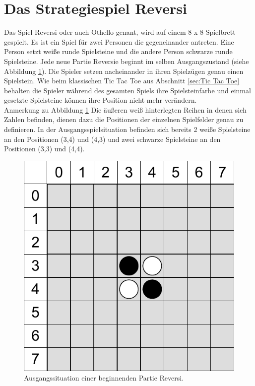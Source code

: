 \section{Das Strategiespiel Reversi}
\label{sec:Das Strategiespiel Reversi}
Das Spiel Reversi oder auch Othello genant, wird auf einem 8 x 8 Spielbrett gespielt. Es ist ein Spiel für zwei Personen die gegeneinander antreten. Eine Person setzt weiße runde Spielsteine und die andere Person schwarze runde Spielsteine. Jede neue Partie Reversie beginnt im selben Ausgangszustand (siehe Abbildung \ref{fig:ausgangssituation_reversi}). Die Spieler setzen nacheinander in ihren Spielzügen genau einen Spielstein. Wie beim klassischen Tic Tac Toe aus Abschnitt \ref{sec:Tic Tac Toe} behalten die Spieler während des gesamten Spiels ihre Spielsteinfarbe und einmal gesetzte Spielsteine können ihre Position nicht mehr verändern. \\

Anmerkung zu Abbildung \ref{fig:ausgangssituation_reversi}  Die äußeren weiß hinterlegten Reihen in denen sich Zahlen befinden, dienen dazu die Positionen der einzelnen Spielfelder genau zu definieren. In der Ausgangsspielsituation befinden sich bereits 2 weiße Spielsteine an den Positionen (3,4) und (4,3) und zwei schwarze Spielsteine an den Positionen (3,3) und (4,4). \\

\begin{figure}[!htbp]
  \centering
  \includegraphics[scale=0.5]{inhalt/abbildungen/ausgangssituation_reversi.pdf}
  \caption{Ausgangssituation einer beginnenden Partie Reversi.}
  \label{fig:ausgangssituation_reversi}
\end{figure}

